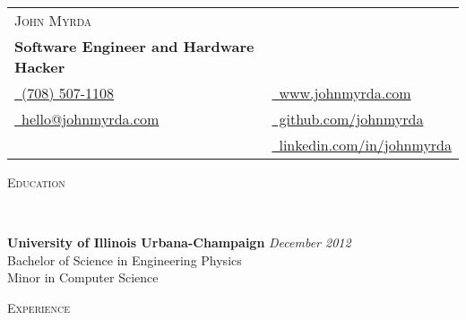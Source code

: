 \documentclass{article}
\newenvironment{changemargin}[2]{%
  \begin{list}{}{%
    \setlength{\topsep}{0pt}%
    \setlength{\leftmargin}{#1}%
    \setlength{\rightmargin}{#2}%
    \setlength{\listparindent}{\parindent}%
    \setlength{\itemindent}{\parindent}%
    \setlength{\parsep}{\parskip}%
  }%
  \item[]}{\end{list}
}
\newcommand{\lineover}{
	\begin{changemargin}{-0.05in}{-0.05in}
		\vspace*{-8pt}
		\hrulefill \\
		\vspace*{-2pt}
	\end{changemargin}
}
\newcommand{\header}[1]{
	\begin{changemargin}{-0.5in}{-0.5in}
		\scshape{#1}\\
  	\lineover
	\end{changemargin}
}
\newcommand{\contact}[7]{
	\begin{changemargin}{-0.5in}{-0.5in}
		\begin{tabular}{l l}
			\Large \scshape {#1}\\
			\textbf{#2}\\
			{#3} & {#5}\\ 
			{#4} & {#6}\\
			 & {#7}\\
		\end{tabular}
	\end{changemargin}
}
\newenvironment{body} {
	\vspace*{-16pt}
	\begin{changemargin}{-0.25in}{-0.5in}
  }	
	{\end{changemargin}
}
\begin{document}
\contact{John Myrda}
{Software Engineer and Hardware Hacker}
{\href{tel:7085071108}{\faPhone\ (708) 507-1108}}
{\href{mailto:hello@johnmyrda.com}{\faEnvelope\ hello@johnmyrda.com}}
{\href{https://www.johnmyrda.com}{\faLink\ www.johnmyrda.com}}
{\href{https://github.com/johnmyrda/resume}{\faGithub\ github.com/johnmyrda}}
{\href{https://www.linkedin.com/in/johnmyrda}{\faLinkedin\ linkedin.com/in/johnmyrda}}





\header{Education}
	\vspace{14pt}
\begin{body}

	\textbf{University of Illinois Urbana-Champaign} \hfill \emph{December 2012}{} \\
	\hspace{4ex} Bachelor of Science in Engineering Physics \\
	\hspace{4ex} Minor in Computer Science\\
\end{body}


\header{Experience}
\end{document}
